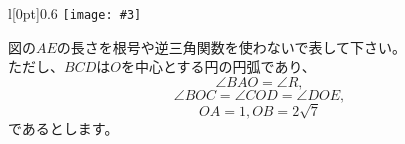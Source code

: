 \documentclass[a4j,dvipdfmx]{jsarticle}
\newcommand{\chart}[3]{
  \begin{wrapfigure}{l}[0pt]{#1 \textwidth}\centering\texttt{[image: \#3]}\end{wrapfigure}}
\newcommand{\divh}[0]{\parbox[t]{\dimexpr\columnwidth-\leftmargini}}
\begin{document}
\divh{\chart{0.6}{width=10cm}{fan-0.mps}
図の$AE$の長さを根号や逆三角関数を使わないで表して下さい。\\

ただし、$BCD$は$O$を中心とする円の円弧であり、
$$\angle BAO = \angle R,$$
$$ \angle BOC = \angle COD = \angle DOE,$$
$$ OA=1, OB=2\sqrt7$$
であるとします。
}
\end{document}
